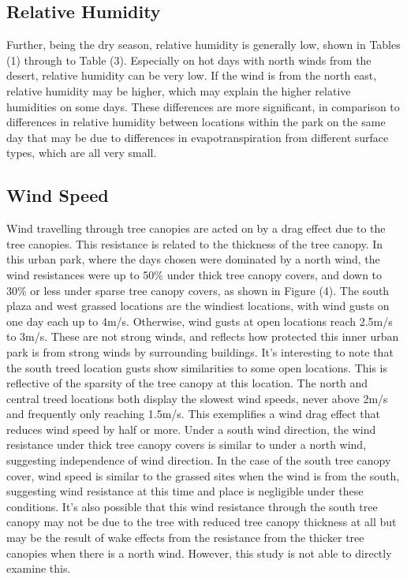 \documentclass[twocolumn, a4paper]{article}
\begin{document}
\subsection{Relative Humidity}
Further, being the dry season, relative humidity is generally low, shown in Tables (1) through to Table (3). Especially on hot days with north winds from the desert, relative humidity can be very low. If the wind is from the north east, relative humidity may be higher, which may explain the higher relative humidities on some days. These differences are more significant, in comparison to differences in relative humidity between locations within the park on the same day that may be due to differences in evapotranspiration from different surface types, which are all very small.
\subsection{Wind Speed}
Wind travelling through tree canopies are acted on by a drag effect due to the tree canopies. This resistance is related to the thickness of the tree canopy. In this urban park, where the days chosen were dominated by a north wind, the wind resistances were up to 50\% under thick tree canopy covers, and down to 30\% or less under sparse tree canopy covers, as shown in Figure (4). The south plaza and west grassed locations are the windiest locations, with wind gusts on one day each up to 4m/s. Otherwise, wind gusts at open locations reach 2.5m/s to 3m/s. These are not strong winds, and reflects how protected this inner urban park is from strong winds by surrounding buildings. It's interesting to note that the south treed location gusts show similarities to some open locations. This is reflective of the sparsity of the tree canopy at this location. The north and central treed locations both display the slowest wind speeds, never above 2m/s and frequently only reaching 1.5m/s. This exemplifies a wind drag effect that reduces wind speed by half or more. 
Under a south wind direction, the wind resistance under thick tree canopy covers is similar to under a north wind, suggesting independence of wind direction. In the case of the south tree canopy cover, wind speed is similar to the grassed sites when the wind is from the south, suggesting wind resistance at this time and place is negligible under these conditions. It’s also possible that this wind resistance through the south tree canopy may not be due to the tree with reduced tree canopy thickness at all but may be the result of wake effects from the resistance from the thicker tree canopies when there is a north wind. However, this study is not able to directly examine this.
\end{document}
